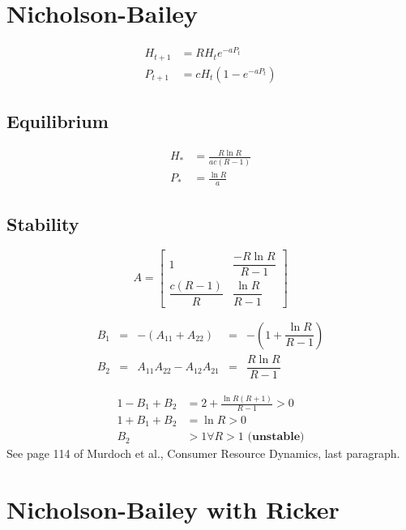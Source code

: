 \documentclass{article}
\begin{document}
\newcommand{\pn}[1]{\left(#1\right)}

\section{Nicholson-Bailey}
\begin{align*}
    H_{t+1} &= R H_t e^{-a P_t}\\
    P_{t+1} &= c H_t \pn{1 - e^{-a P_t}}
\end{align*}

\subsection{Equilibrium}
\begin{align*}
    H_* &= \frac{R \ln{R}}{a c \pn{R-1}}\\
    P_* &= \frac{\ln R}{a}
\end{align*}

\subsection{Stability}
\begin{equation*}
    A = \left[ \begin{array}{ll}
    1 & \dfrac{-R \ln{R}}{R-1}\\
    \dfrac{c\pn{R-1}}{R} & \dfrac{\ln{R}}{R-1}
    \end{array} \right]
\end{equation*}

\begin{equation*}
\begin{array}{lclcl}
B_1 &=& -\pn{A_{11}+A_{22}}  &=& -\pn{1+\dfrac{\ln{R}}{R-1}} \\
B_2 &=& A_{11}A_{22}-A_{12}A_{21} &=& \dfrac{R\ln{R}}{R-1} 
\end{array}
\end{equation*}

\begin{align*}
1 - B_1 + B_2 &= 2 + \frac{\ln{R}\pn{R+1}}{R-1} > 0\\
1 + B_1 + B_2 &= \ln{R} > 0\\
B_2 &> 1 \forall R > 1 \textbf{ (unstable)}
\end{align*}
See page 114 of Murdoch et al., Consumer Resource Dynamics, last paragraph.



\pagebreak
\section{Nicholson-Bailey with Ricker}
\end{document}
